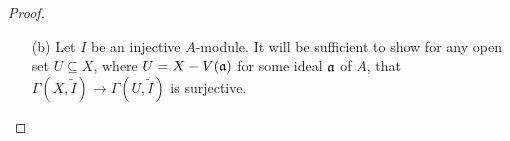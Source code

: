 \documentclass{article}
\begin{document}
\begin{enumerate} [label=\textbf{\arabic*.}, leftmargin=0em]
\begin{proof}
\begin{itemize} [leftmargin=0cm]
It remains to show $\phi$ is surjective.
Let $s \in \Gamma(U, \widetilde{M})$ be any section.
For each $i$, we can express $\restr{s}{U_i}$ as $m_i/f_i^{n_i}$ for some $n_i > 0$ and $m_i \in M$ such that $\restr{m_i/f_i^{n_i}}{U_i \cap U_j} = \restr{m_j/f_j^{n_j}}{U_i \cap U_j}$, where $U_i \cap U_j = \spec{A_{f_if_j}}$ for all $i, j$.
Choose $n = n_i$ that works for all $i$, so we have
\begin{equation*}
  \frac{f_j^n m_i}{(f_if_j)^n} = \frac{f_i^n m_j}{(f_if_j)^n}.
\end{equation*}
We want to show there exists an $A$-homomoprhism $\alpha : \goth{a}^N \to M$ for some $N \geq n$ such that $\alpha_i(1) = f_i^{N-n} m_i / f_i^N$.
Imitating the proof of (3.3), let $\goth{b}_1 \subseteq \goth{b}_2 \subseteq \cdots$ be the sequence of annihilators of $\cdots \subseteq \goth{a}^2 \subseteq \goth{a}$.
Since $A$ is Noetherian, there is an $r$ such that $\goth{b}_r = \goth{b}_{r + 1} = \cdots$.
Define $\sigma : \goth{a}^{n + r} \to M$ by sending $f_i^{n + r}$ to $f_i^r m_i$ for all $i$ and extending by zero.
This is a well-defined homomorphism because the annihilator of $f_i^{n + r}$ is $\goth{b}_{n + r} = \goth{b}_r$, and $\goth{b}_r$ annhilates $f_i^r m_i$.
Hence, $\phi_{n + r}(\sigma) = s$.

\item[(b)] Let $I$ be an injective $A$-module.
It will be sufficient to show for any open set $U \subseteq X$, where $U = X - V(\mathfrak{a})$ for some ideal $\mathfrak{a}$ of $A$, that $\Gamma(X, \tilde{I}) \to \Gamma(U, \tilde{I})$ is surjective.
\end{itemize}
\end{proof}

\end{enumerate}
\end{document}
